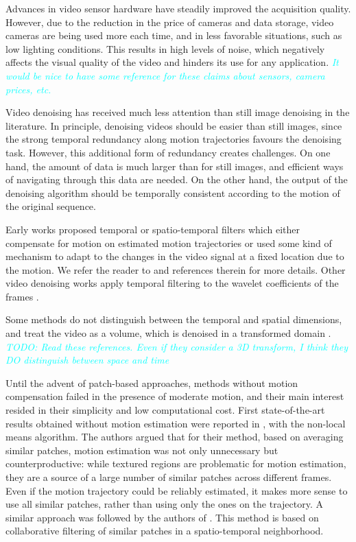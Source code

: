 \documentclass[10pt, journal, twocolumn, final, a4paper]{IEEEtran}
\newcommand{\pa}[1]{\textcolor{cyan}{#1}}
\newcommand{\pcomment}[1]{\textit{\pa{#1}}}
\begin{document}
Advances in video sensor hardware have steadily improved the acquisition
quality. However, due to the reduction in the price of cameras
and data storage, video cameras are being used more each time, and in less
favorable situations, such as low lighting conditions. This results in high 
levels of noise, which negatively affects the visual quality of the video and
hinders its use for any application. 
\pcomment{It would be nice to have some reference for these claims about
sensors, camera prices, etc.}

Video denoising has received much less attention than still image denoising in
the literature.  In principle, denoising videos should be easier than still
images, since the strong temporal redundancy along motion trajectories favours
the denoising task. However, this additional form of redundancy creates
challenges.  On one hand, the amount of data is much larger than for still
images, and efficient ways of navigating through this data are needed. On the
other hand, the output of the denoising algorithm should be temporally
consistent according to the motion of the original sequence.

Early works proposed temporal or spatio-temporal filters which either compensate
for motion on estimated motion trajectories or used some kind of mechanism to
adapt to the changes in the video signal at a fixed location due to the motion.
We refer the reader to \cite{Brailean1995a} and references therein for more details.
Other video denoising works apply temporal filtering to the wavelet coefficients 
of the frames \cite{Jin2006,Zlokolica2006a}. 

Some methods do not distinguish between the temporal and spatial dimensions,
and treat the video as a volume, which is denoised in a transformed domain
\cite{Rajpoot2003,Wilson2004,Selesnick2003}. 
\pcomment{TODO: Read these references. Even if they consider a 3D transform, I think
they DO distinguish between space and time}

Until the advent of patch-based approaches, methods without motion compensation
failed in the presence of moderate motion, and their main interest resided
in their simplicity and low computational cost. First state-of-the-art results
obtained without motion estimation were reported in \cite{Buades2005v}, with the
non-local means algorithm. The authors argued that for their method, based on
averaging similar patches, motion estimation was not only unnecessary but
counterproductive: while textured regions are problematic for motion
estimation, they are a source of a large number of similar patches across
different frames. Even if the motion trajectory could be reliably estimated, it
makes more sense to use all similar patches, rather than using only the ones on the
trajectory.
%
A similar approach was followed by the authors of \cite{Dabov2007v}. This method is based
on collaborative filtering of similar patches in a
spatio-temporal neighborhood. 
\end{document}
